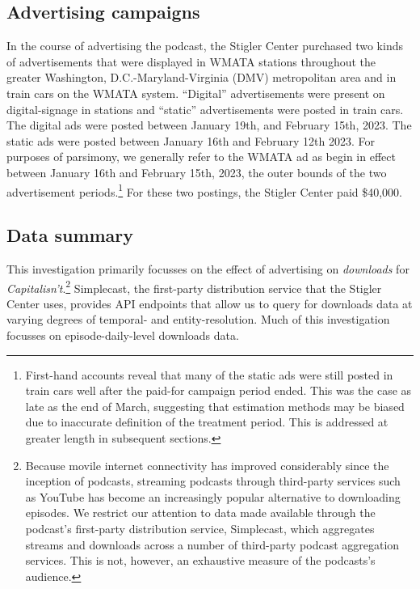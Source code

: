 \documentclass[11pt, letterpaper, twoside]{article}
\begin{document}
\subsection{Advertising campaigns}
In the course of advertising the podcast, the Stigler Center purchased two kinds of advertisements that were displayed in WMATA stations throughout the greater Washington, D.C.-Maryland-Virginia (DMV) metropolitan area and in train cars on the WMATA system. ``Digital'' advertisements were present on digital-signage in stations and ``static'' advertisements were posted in train cars. The digital ads were posted between January 19th, and February 15th, 2023. The static ads were posted between January 16th and February 12th 2023. For purposes of parsimony, we generally refer to the WMATA ad as begin in effect between January 16th and February 15th, 2023, the outer bounds of the two advertisement periods.\footnote{First-hand accounts reveal that many of the static ads were still posted in train cars well after the paid-for campaign period ended. This was the case as late as the end of March, suggesting that estimation methods may be biased due to inaccurate definition of the treatment period. This is addressed at greater length in subsequent sections.} For these two postings, the Stigler Center paid \$40,000.

\subsection{Data summary}
This investigation primarily focusses on the effect of advertising on \textit{downloads} for \textit{Capitalisn't}.\footnote{Because movile internet connectivity has improved considerably since the inception of podcasts, streaming podcasts through third-party services such as YouTube has become an increasingly popular alternative to downloading episodes. We restrict our attention to data made available through the podcast's first-party distribution service, Simplecast, which aggregates streams and downloads across a number of third-party podcast aggregation services. This is not, however, an exhaustive measure of the podcasts's audience.} Simplecast, the first-party distribution service that the Stigler Center uses, provides API endpoints that allow us to query for downloads data at varying degrees of temporal- and entity-resolution. Much of this investigation focusses on episode-daily-level downloads data.\\
\end{document}
